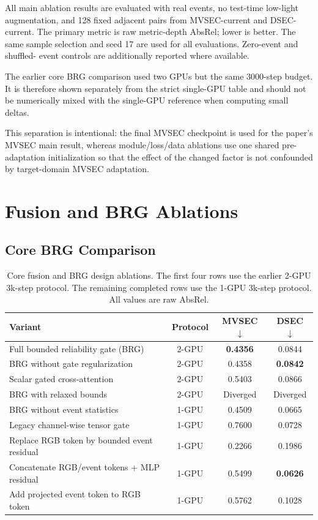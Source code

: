 \documentclass[10pt]{article}
\newcommand{\best}[1]{\textbf{#1}}
\newcommand{\down}{\ensuremath{\downarrow}}
\begin{document}
All main ablation results are evaluated with real events, no test-time low-light
augmentation, and 128 fixed adjacent pairs from MVSEC-current and DSEC-current.
The primary metric is raw metric-depth AbsRel; lower is better.  The same sample
selection and seed 17 are used for all evaluations.  Zero-event and shuffled-
event controls are additionally reported where available.

The earlier core BRG comparison used two GPUs but the same 3000-step budget.
It is therefore shown separately from the strict single-GPU table and should
not be numerically mixed with the single-GPU reference when computing small
deltas.

This separation is intentional: the final MVSEC checkpoint is used for the
paper's MVSEC main result, whereas module/loss/data ablations use one shared
pre-adaptation initialization so that the effect of the changed factor is not
confounded by target-domain MVSEC adaptation.

\section{Fusion and BRG Ablations}

\subsection{Core BRG Comparison}

\begin{table}[h]
\centering
\caption{Core fusion and BRG design ablations.  The first four rows use the
earlier 2-GPU 3k-step protocol.  The remaining completed rows use the 1-GPU
3k-step protocol.  All values are raw AbsRel.}
\label{tab:fusion}
\begin{tabular}{lccc}
\toprule
Variant & Protocol & MVSEC \down & DSEC \down \\
\midrule
Full bounded reliability gate (BRG) & 2-GPU & \best{0.4356} & 0.0844 \\
BRG without gate regularization & 2-GPU & 0.4358 & \best{0.0842} \\
Scalar gated cross-attention & 2-GPU & 0.5403 & 0.0866 \\
BRG with relaxed bounds & 2-GPU & Diverged & Diverged \\
\midrule
BRG without event statistics & 1-GPU & 0.4509 & 0.0665 \\
Legacy channel-wise tensor gate & 1-GPU & 0.7600 & 0.0728 \\
Replace RGB token by bounded event residual & 1-GPU & 0.2266 & 0.1986 \\
Concatenate RGB/event tokens + MLP residual & 1-GPU & 0.5499 & \best{0.0626} \\
Add projected event token to RGB token & 1-GPU & 0.5762 & 0.1028 \\
\bottomrule
\end{tabular}
\end{table}
\end{document}
